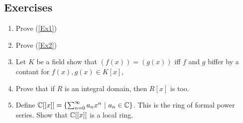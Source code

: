 \documentclass[12pt, twosided]{article}
\begin{document}
\subsection{Exercises}
\begin{enumerate}
\item Prove (\ref{Ex1})
\item Prove (\ref{Ex2})
\item Let \(K\) be a field show that \((f(x)) = (g(x))\) iff \(f\) and \(g\) biffer by a contant for \(f(x), g(x) \in K[x]\), 
\item Prove that if \(R\) is an integral domain, then \(R[x]\) is too.
\item Define \(\mathbb{C}[[x]] = \left\{ \sum_{n=0}^\infty a_nx^n \ \middle\vert\  a_n \in \mathbb{C}\right\}\). This is the ring of formal power series. Show that \(\mathbb{C}[[x]]\) is a local ring.
\end{enumerate}
\end{document}
